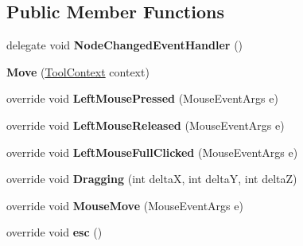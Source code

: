 \subsection*{Public Member Functions}
\begin{DoxyCompactItemize}
\item 
\hypertarget{class_interface_graphique_1_1_tools_1_1_move_aa447ff931a7cb490a7b44de3a7589292}{}delegate void {\bfseries Node\+Changed\+Event\+Handler} ()\label{class_interface_graphique_1_1_tools_1_1_move_aa447ff931a7cb490a7b44de3a7589292}

\item 
\hypertarget{class_interface_graphique_1_1_tools_1_1_move_a3874341a9c03a104287546f92b72cea9}{}{\bfseries Move} (\hyperlink{class_interface_graphique_1_1_tools_1_1_tool_context}{Tool\+Context} context)\label{class_interface_graphique_1_1_tools_1_1_move_a3874341a9c03a104287546f92b72cea9}

\item 
\hypertarget{class_interface_graphique_1_1_tools_1_1_move_a9bb3775998416ea36c2ca7009f37a6d9}{}override void {\bfseries Left\+Mouse\+Pressed} (Mouse\+Event\+Args e)\label{class_interface_graphique_1_1_tools_1_1_move_a9bb3775998416ea36c2ca7009f37a6d9}

\item 
\hypertarget{class_interface_graphique_1_1_tools_1_1_move_abff4c343d842c5513749a8c1f4c35338}{}override void {\bfseries Left\+Mouse\+Released} (Mouse\+Event\+Args e)\label{class_interface_graphique_1_1_tools_1_1_move_abff4c343d842c5513749a8c1f4c35338}

\item 
\hypertarget{class_interface_graphique_1_1_tools_1_1_move_ab3c7919f138fa833fdf999adba7c8fdb}{}override void {\bfseries Left\+Mouse\+Full\+Clicked} (Mouse\+Event\+Args e)\label{class_interface_graphique_1_1_tools_1_1_move_ab3c7919f138fa833fdf999adba7c8fdb}

\item 
\hypertarget{class_interface_graphique_1_1_tools_1_1_move_ab6ce1689b59b7b60c55838ff344c8d7c}{}override void {\bfseries Dragging} (int delta\+X, int delta\+Y, int delta\+Z)\label{class_interface_graphique_1_1_tools_1_1_move_ab6ce1689b59b7b60c55838ff344c8d7c}

\item 
\hypertarget{class_interface_graphique_1_1_tools_1_1_move_ab9f7749ef77fb21f385a9bc5b43bf234}{}override void {\bfseries Mouse\+Move} (Mouse\+Event\+Args e)\label{class_interface_graphique_1_1_tools_1_1_move_ab9f7749ef77fb21f385a9bc5b43bf234}

\item 
\hypertarget{class_interface_graphique_1_1_tools_1_1_move_a72e41dcdef93cd060e499bd1f8683512}{}override void {\bfseries esc} ()\label{class_interface_graphique_1_1_tools_1_1_move_a72e41dcdef93cd060e499bd1f8683512}

\end{DoxyCompactItemize}
